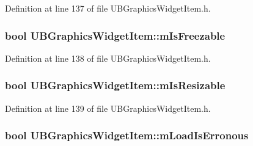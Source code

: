 Definition at line 137 of file U\-B\-Graphics\-Widget\-Item.\-h.

\hypertarget{class_u_b_graphics_widget_item_a7dc13bd68e90e669b7b6537a77a40491}{
\subsubsection[{m\-Is\-Freezable}]{\setlength{\rightskip}{0pt plus 5cm}bool U\-B\-Graphics\-Widget\-Item\-::m\-Is\-Freezable\hspace{0.3cm}{\ttfamily [protected]}}}\label{d0/d16/class_u_b_graphics_widget_item_a7dc13bd68e90e669b7b6537a77a40491}


Definition at line 138 of file U\-B\-Graphics\-Widget\-Item.\-h.

\hypertarget{class_u_b_graphics_widget_item_a1ef7d9bd5a948e5055de3590e72c386c}{
\subsubsection[{m\-Is\-Resizable}]{\setlength{\rightskip}{0pt plus 5cm}bool U\-B\-Graphics\-Widget\-Item\-::m\-Is\-Resizable\hspace{0.3cm}{\ttfamily [protected]}}}\label{d0/d16/class_u_b_graphics_widget_item_a1ef7d9bd5a948e5055de3590e72c386c}


Definition at line 139 of file U\-B\-Graphics\-Widget\-Item.\-h.

\hypertarget{class_u_b_graphics_widget_item_a87aaf594b4fc01d929d647cb91cbf0b3}{
\subsubsection[{m\-Load\-Is\-Erronous}]{\setlength{\rightskip}{0pt plus 5cm}bool U\-B\-Graphics\-Widget\-Item\-::m\-Load\-Is\-Erronous\hspace{0.3cm}{\ttfamily [protected]}}}\label{d0/d16/class_u_b_graphics_widget_item_a87aaf594b4fc01d929d647cb91cbf0b3}


